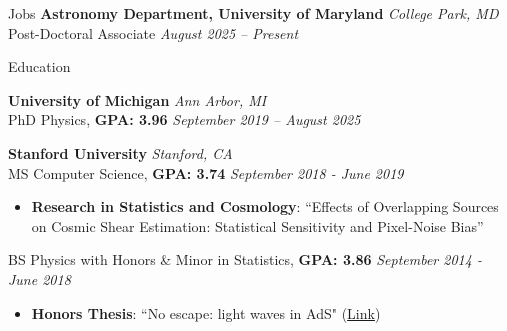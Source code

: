 \documentclass{resume} %
\begin{document}
\begin{rSection}{Jobs}
{\bf Astronomy Department, University of Maryland} \hfill {\em College Park, MD} 
\\ Post-Doctoral Associate \hfill {\em August 2025 -- Present}
\end{rSection}

\begin{rSection}{Education}

{\bf University of Michigan} \hfill {\em Ann Arbor, MI} 
\\ PhD Physics, \textbf{GPA: 3.96} \hfill {\em September 2019 -- August 2025}
\vspace*{-0.1cm}
%

{\bf Stanford University} \hfill {\em Stanford, CA} 
\\ MS Computer Science, \textbf{GPA: 3.74} \hfill {\em September 2018 - June 2019}

\vspace*{-0.1cm}
%
\begin{itemize}[itemsep=-0.3em] %

    \item 
    \textbf{Research in Statistics and Cosmology}: ``Effects of Overlapping Sources on Cosmic Shear Estimation:  Statistical Sensitivity and Pixel-Noise Bias''
\end{itemize}

%
BS Physics with Honors \& Minor in Statistics, \textbf{GPA: 3.86} \hfill {\em September 2014 - June 2018}
%
\vspace*{-0.1cm}
\begin{itemize}[itemsep=-0.25em] 

    \item 
    \textbf{Honors Thesis}: ``No escape: light waves in AdS" (\href{https://purl.stanford.edu/vf208qp2190}{Link})

\end{itemize}
%
\vspace*{-0.1cm}
\end{rSection}

\end{document}
